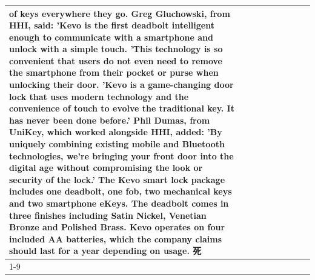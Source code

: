 \begin{table}[H]
\begin{tabular}{lllrlllll}
of keys everywhere they go. Greg Gluchowski, from HHI, said: 'Kevo is the first deadbolt intelligent enough to communicate with a smartphone and unlock with a simple touch. 'This technology is so convenient that users do not even need to remove the smartphone from their pocket or purse when unlocking their door. 'Kevo is a game-changing door lock that uses modern technology and the convenience of touch to evolve the traditional key. It has never been done before.' Phil Dumas, from UniKey, which worked alongside HHI, added: 'By uniquely combining existing mobile and Bluetooth technologies, we’re bringing your front door into the digital age without compromising the look or security of the lock.' The Kevo smart lock package includes one deadbolt, one fob, two mechanical keys and two smartphone eKeys. The deadbolt comes in three finishes including Satin Nickel, Venetian Bronze and Polished Brass. Kevo operates on four included AA batteries, which the company claims should last for a year depending on usage. 死 \\
\cline{1-9}

\end{tabular}
\end{table}
